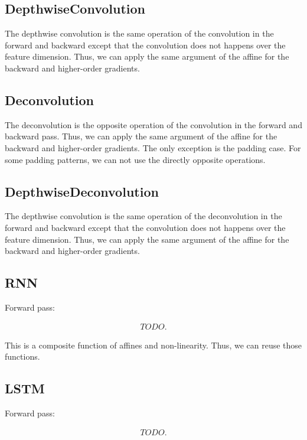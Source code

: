 \documentclass{article}
\begin{document}
\subsection{DepthwiseConvolution}

The depthwise convolution is the same operation of the convolution in the forward and backward except that the convolution does not happens over the feature dimension. Thus, we can apply the same argument of the affine for the backward and higher-order gradients.

\subsection{Deconvolution}
The deconvolution is the opposite operation of the convolution in the forward and backward pass. Thus, we can apply the same argument of the affine for the backward and higher-order gradients. The only exception is the padding case. For some padding patterns, we can not use the directly opposite operations.

\subsection{DepthwiseDeconvolution}

The depthwise convolution is the same operation of the deconvolution in the forward and backward except that the convolution does not happens over the feature dimension. Thus, we can apply the same argument of the affine for the backward and higher-order gradients.

\subsection{RNN}

Forward pass:

\begin{eqnarray}
  TODO.
\end{eqnarray}

This is a composite function of affines and non-linearity. Thus, we can reuse those functions.

\subsection{LSTM}

Forward pass:

\begin{eqnarray}
  TODO.  
\end{eqnarray}
\end{document}
